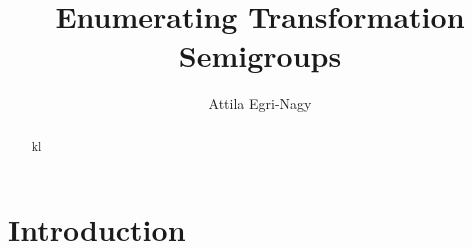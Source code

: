 \documentclass{amsart}
\newcommand{\cT}{{\mathcal T}}
\theoremstyle{plain}
\theoremstyle{definition}
\begin{document}
\author{Attila Egri-Nagy}
\address{...}
\title{Enumerating Transformation Semigroups}


\maketitle
\begin{abstract}
kl
\end{abstract}



\section{Introduction}
\end{document}
